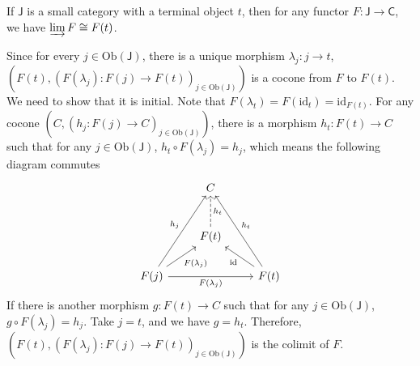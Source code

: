 \begin{lemma}{}{}
    If $\mathsf{J}$ is a small category with a terminal object $t$, then for any functor $F:\mathsf{J}\to \mathsf{C}$, we have $\varinjlim F\cong F(t)$.
\end{lemma}
\begin{prf}
    Since for every $j\in \mathrm{Ob}(\mathsf{J})$, there is a unique morphism $\lambda_j:j\to t$, $\left(F(t),\left(F(\lambda_j):F(j)\to F(t)\right)_{j\in \mathrm{Ob}(\mathsf{J})}\right)$ is a cocone from $F$ to $F(t)$. We need to show that it is initial. Note that $F\left(\lambda_t \right)=F(\mathrm{id}_t)=\mathrm{id}_{F(t)}$. For any cocone $\left(C,\left(h_j:F(j)\to C\right)_{j\in \mathrm{Ob}(\mathsf{J})}\right)$, there is a morphism $h_t:F(t)\to C$ such that for any $j\in \mathrm{Ob}(\mathsf{J})$, $h_t\circ  F(\lambda_j) =h_j$, which means the following diagram commutes
    \[
    \begin{tikzcd}
            & C                                  &                                                    \\[+10pt]
            & F(t) \arrow[u, "h_t"', dashed] &                                                    \\
    F(j) \arrow[ru, "F(\lambda_j)"'] \arrow[ruu, "h_j"] \arrow[rr, "F(\lambda_j)"'] &                                    & F(t) \arrow[lu, "\mathrm{id}"] \arrow[luu, "h_t"']
    \end{tikzcd}
    \]
    If there is another morphism $g:F(t)\to C$ such that for any $j\in \mathrm{Ob}(\mathsf{J})$, $g\circ  F(\lambda_j) =h_j$. Take $j=t$, and we have $g=h_t$. Therefore, $\left(F(t),\left(F(\lambda_j):F(j)\to F(t)\right)_{j\in \mathrm{Ob}(\mathsf{J})}\right)$ is the colimit of $F$.

\end{prf}

